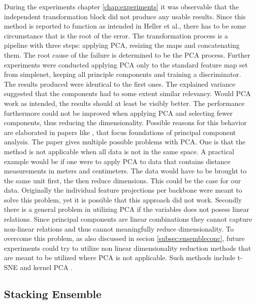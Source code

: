 During the experiments chapter \ref{chap:experiments} it was observable that the independent transformation block \cite{EnsembleHeller2023} did not produce any usable results. 
Since this method is reported to function as intended in Heller et al., there has to be some circumstance that is the root of the error. The transformation process is a 
pipeline with three steps: applying PCA, resizing the maps and concatenating them. \newline
The root cause of the failure is determined to be the PCA process. Further experiments were conducted applying PCA only to the standard feature map set from simplenet, 
keeping all principle components and training 
a discriminator. The results produced were identical to the first ones. The explained variance suggested that the components had to some extent similar relevancy. Would PCA 
work as intended, the results should at least be visibly better. The performance furthermore could not be improved when applying PCA and selecting fewer components, thus reducing 
the dimensionality. Possible reasons for this behavior are elaborated in papers like \cite{Jolliffe_2016PCAbasics}, that focus foundations of principal component analysis. 
The paper gives multiple possible problems with PCA. One is that the method is not applicable when all data is not in the same space. A practical example would be if one were to 
apply PCA to data that contains distance measurements in meters and centimeters. The data would have to be brought to the same unit first, the then reduce dimensions. This could 
be the case for our data. Originally the individual feature projections per backbone were meant to solve this problem, yet it is possible that this approach did not work. 
Secondly there is a general problem in utilizing PCA if the variables does not posess linear relations. Since principal components are linear combinations \cite{Jolliffe_2016PCAbasics} 
they cannot capture non-linear relations and thus cannot meaningfully reduce dimensionality. To overcome this problem, as also discussed in secion \ref{subsec:ensembleconc}, 
future experiments could try to utilize non linear dimensionality reduction methods that are meant to be utilized where PCA is not applicable. Such methods include t-SNE \cite{tSNE} 
and kernel PCA \cite{Hoffmann_2007kernelPCA}.



\subsection{Stacking Ensemble}
\label{subsec:stackingdiscussion}

